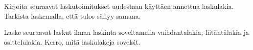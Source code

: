 \begin{tehtavasivu}

\begin{tehtava}
Kirjoita seuraavat laskutoimitukset uudestaan käyttäen annettua laskulakia. Tarkista laskemalla, että tulos säilyy samana.

    \begin{alakohdat}
    \end{alakohdat}
    \begin{vastaus}
	\begin{alakohdat}
	\end{alakohdat}
    \end{vastaus}
\end{tehtava}

\begin{tehtava}
Laske seuraavat laskut ilman laskinta soveltamalla vaihdantalakia, liitäntälakia ja osittelulakia.
Kerro, mitä laskulakeja sovelsit.


\end{tehtava}
\end{tehtavasivu}
